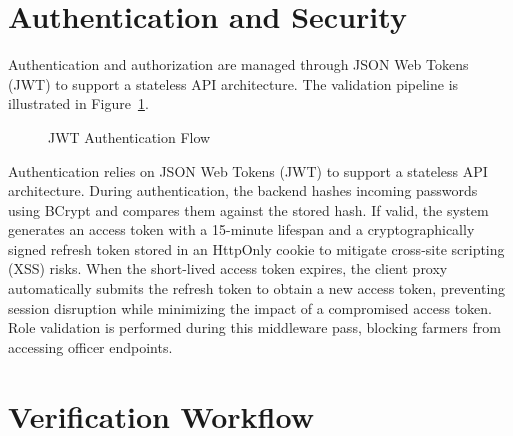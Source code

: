 \section{Authentication and Security}
\label{sec:backend-security}

Authentication and authorization are managed through JSON Web Tokens (JWT) to support a stateless API architecture. The validation pipeline is illustrated in Figure~\ref{fig:jwt-backend-flow}.

\begin{figure}[H]
\centering
{}
\caption{JWT Authentication Flow}
\label{fig:jwt-backend-flow}
\end{figure}

Authentication relies on JSON Web Tokens (JWT) to support a stateless API architecture. During authentication, the backend hashes incoming passwords using BCrypt and compares them against the stored hash. If valid, the system generates an access token with a 15-minute lifespan and a cryptographically signed refresh token stored in an HttpOnly cookie to mitigate cross-site scripting (XSS) risks. When the short-lived access token expires, the client proxy automatically submits the refresh token to obtain a new access token, preventing session disruption while minimizing the impact of a compromised access token. Role validation is performed during this middleware pass, blocking farmers from accessing officer endpoints.

\section{Verification Workflow}
\label{sec:verification-workflow}

